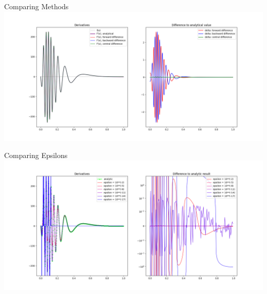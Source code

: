 
\begin{frame}{Comparing Methods}
%
\includegraphics[width=\linewidth]{./gfx/03-derivative-methods}
%
\end{frame}


\begin{frame}{Comparing Epsilons}
%
\includegraphics[width=\linewidth]{./gfx/03-derivative-epsilons}
%
\end{frame}



